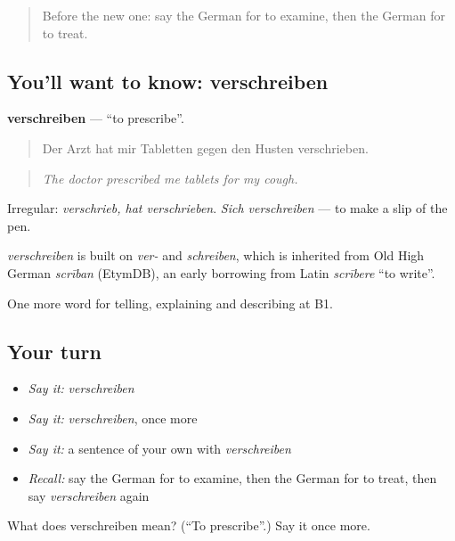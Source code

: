 \label{lesson:GE-C487-verschreiben}



\begin{quote}
Before the new one: say the German for to examine, then the German for to treat.
\end{quote}

\subsection*{You'll want to know: verschreiben}
\textbf{verschreiben} — \textquotedblleft{}to prescribe\textquotedblright{}.

\begin{quote}
Der Arzt hat mir Tabletten gegen den Husten verschrieben.
\end{quote}

\begin{quote}
\emph{The doctor prescribed me tablets for my cough.}
\end{quote}

Irregular: \emph{verschrieb, hat verschrieben}. \emph{Sich verschreiben} — to make a slip of the pen.

\begin{cousinweb}
\emph{verschreiben} is built on \emph{ver-} and \emph{schreiben}, which is inherited from Old High German \emph{scrīban} (EtymDB), an early borrowing from Latin \emph{scrībere} \textquotedblleft{}to write\textquotedblright{}.
\end{cousinweb}

\begin{grammarlens}[title={What you've built}]
One more word for telling, explaining and describing at B1.
\end{grammarlens}

\subsection*{Your turn}
\begin{itemize}
\raggedright
  \item \emph{Say it:} \emph{verschreiben}
  \item \emph{Say it:} \emph{verschreiben}, once more
  \item \emph{Say it:} a sentence of your own with \emph{verschreiben}
  \item \emph{Recall:} say the German for to examine, then the German for to treat, then say \emph{verschreiben} again
\end{itemize}

\begin{tcolorbox}[breakable,colback=teal!4,colframe=teal!35!black,title={Before you move on}]
What does verschreiben mean? (\textquotedblleft{}To prescribe\textquotedblright{}.) Say it once more.
\end{tcolorbox}
